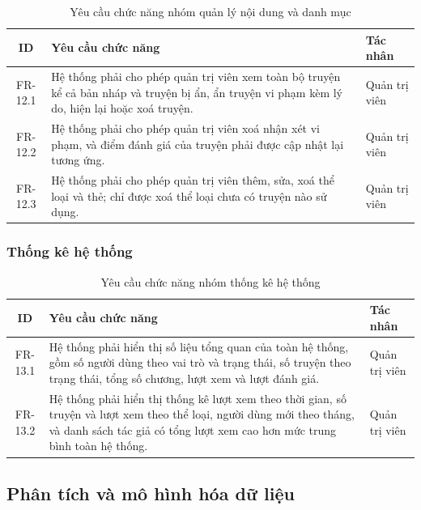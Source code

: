 \begin{table}[H]
\centering
\renewcommand{\arraystretch}{1.3}
\begin{tabularx}{\textwidth}{|c|X|p{3cm}|}
\hline
\textbf{ID} & \textbf{Yêu cầu chức năng} & \textbf{Tác nhân} \\ \hline
FR-12.1 & Hệ thống phải cho phép quản trị viên xem toàn bộ truyện kể cả bản nháp và truyện bị ẩn, ẩn truyện vi phạm kèm lý do, hiện lại hoặc xoá truyện. & Quản trị viên \\ \hline
FR-12.2 & Hệ thống phải cho phép quản trị viên xoá nhận xét vi phạm, và điểm đánh giá của truyện phải được cập nhật lại tương ứng. & Quản trị viên \\ \hline
FR-12.3 & Hệ thống phải cho phép quản trị viên thêm, sửa, xoá thể loại và thẻ; chỉ được xoá thể loại chưa có truyện nào sử dụng. & Quản trị viên \\ \hline
\end{tabularx}
\caption{Yêu cầu chức năng nhóm quản lý nội dung và danh mục}
\label{tab:fr-admin-content}
\end{table}

\subsubsection{Thống kê hệ thống}

\begin{table}[H]
\centering
\renewcommand{\arraystretch}{1.3}
\begin{tabularx}{\textwidth}{|c|X|p{3cm}|}
\hline
\textbf{ID} & \textbf{Yêu cầu chức năng} & \textbf{Tác nhân} \\ \hline
FR-13.1 & Hệ thống phải hiển thị số liệu tổng quan của toàn hệ thống, gồm số người dùng theo vai trò và trạng thái, số truyện theo trạng thái, tổng số chương, lượt xem và lượt đánh giá. & Quản trị viên \\ \hline
FR-13.2 & Hệ thống phải hiển thị thống kê lượt xem theo thời gian, số truyện và lượt xem theo thể loại, người dùng mới theo tháng, và danh sách tác giả có tổng lượt xem cao hơn mức trung bình toàn hệ thống. & Quản trị viên \\ \hline
\end{tabularx}
\caption{Yêu cầu chức năng nhóm thống kê hệ thống}
\label{tab:fr-admin-stats}
\end{table}

\subsection{Phân tích và mô hình hóa dữ liệu}
\label{subsec:data-modeling}

